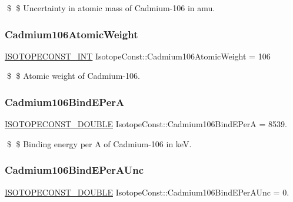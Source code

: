 \$ \$ Uncertainty in atomic mass of Cadmium-\/106 in amu. \mbox{\label{group___isotope_const-_cadmium-_cd106_ga3163a90507bc4339217e369df6b29499}} 
\subsubsection{\texorpdfstring{Cadmium106\+Atomic\+Weight}{Cadmium106AtomicWeight}}
{\footnotesize\ttfamily \mbox{\hyperlink{group___isotope_const-_macros_ga5f18360b3e99483a35c32d789e62621c}{I\+S\+O\+T\+O\+P\+E\+C\+O\+N\+S\+T\+\_\+\+I\+NT}} Isotope\+Const\+::\+Cadmium106\+Atomic\+Weight = 106}

\$ \$ Atomic weight of Cadmium-\/106. \mbox{\label{group___isotope_const-_cadmium-_cd106_ga3138e105d4e70b34bb434767773b7da6}} 
\subsubsection{\texorpdfstring{Cadmium106\+Bind\+E\+PerA}{Cadmium106BindEPerA}}
{\footnotesize\ttfamily \mbox{\hyperlink{group___isotope_const-_macros_ga8f45a7272ce02c0b4c65c44636ed719a}{I\+S\+O\+T\+O\+P\+E\+C\+O\+N\+S\+T\+\_\+\+D\+O\+U\+B\+LE}} Isotope\+Const\+::\+Cadmium106\+Bind\+E\+PerA = 8539.}

\$ \$ Binding energy per A of Cadmium-\/106 in keV. \mbox{\label{group___isotope_const-_cadmium-_cd106_ga0f16f7d84efa42b6f0683ddcc3f93ee0}} 
\subsubsection{\texorpdfstring{Cadmium106\+Bind\+E\+Per\+A\+Unc}{Cadmium106BindEPerAUnc}}
{\footnotesize\ttfamily \mbox{\hyperlink{group___isotope_const-_macros_ga8f45a7272ce02c0b4c65c44636ed719a}{I\+S\+O\+T\+O\+P\+E\+C\+O\+N\+S\+T\+\_\+\+D\+O\+U\+B\+LE}} Isotope\+Const\+::\+Cadmium106\+Bind\+E\+Per\+A\+Unc = 0.}

